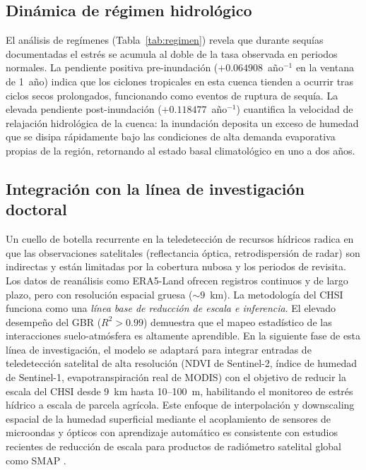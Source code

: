\documentclass[12pt, a4paper]{article}
\begin{document}
\subsection{Dinámica de régimen hidrológico}

El análisis de regímenes (Tabla~\ref{tab:regimen}) revela que durante sequías documentadas el estrés se acumula al doble de la tasa observada en periodos normales. La pendiente positiva pre-inundación ($+0.064908$~año$^{-1}$ en la ventana de 1~año) indica que los ciclones tropicales en esta cuenca tienden a ocurrir tras ciclos secos prolongados, funcionando como eventos de ruptura de sequía. La elevada pendiente post-inundación ($+0.118477$~año$^{-1}$) cuantifica la velocidad de relajación hidrológica de la cuenca: la inundación deposita un exceso de humedad que se disipa rápidamente bajo las condiciones de alta demanda evaporativa propias de la región, retornando al estado basal climatológico en uno a dos años.

\subsection{Integración con la línea de investigación doctoral}

Un cuello de botella recurrente en la teledetección de recursos hídricos radica en que las observaciones satelitales (reflectancia óptica, retrodispersión de radar) son indirectas y están limitadas por la cobertura nubosa y los periodos de revisita. Los datos de reanálisis como ERA5-Land ofrecen registros continuos y de largo plazo, pero con resolución espacial gruesa (${\sim}9$~km). La metodología del CHSI funciona como una \emph{línea base de reducción de escala e inferencia}. El elevado desempeño del GBR ($R^2 > 0.99$) demuestra que el mapeo estadístico de las interacciones suelo-atmósfera es altamente aprendible. En la siguiente fase de esta línea de investigación, el modelo se adaptará para integrar entradas de teledetección satelital de alta resolución (NDVI de Sentinel-2, índice de humedad de Sentinel-1, evapotranspiración real de MODIS) con el objetivo de reducir la escala del CHSI desde 9~km hasta 10--100~m, habilitando el monitoreo de estrés hídrico a escala de parcela agrícola. Este enfoque de interpolación y downscaling espacial de la humedad superficial mediante el acoplamiento de sensores de microondas y ópticos con aprendizaje automático es consistente con estudios recientes de reducción de escala para productos de radiómetro satelital global como SMAP \parencite{ghafari2024spatial}.
\end{document}
